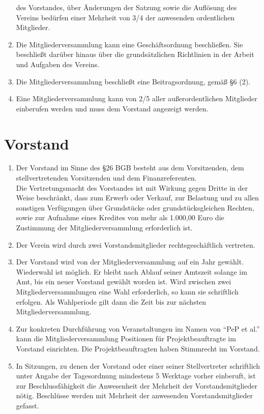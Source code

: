 \documentclass[
  fontsize=12pt,
  paper=a4,
  DIV14,
  parskip,
]{scrartcl}
\begin{document}
\begin{enumerate}
		des Vorstandes, über Änderungen der Satzung sowie die Auflösung des Vereins
		bedürfen einer Mehrheit von 3/4 der anwesenden ordentlichen Mitglieder.
	\item Die Mitgliederversammlung kann eine Geschäftsordnung beschließen. Sie
		beschließt darüber hinaus über die grundsätzlichen Richtlinien in der
		Arbeit und Aufgaben des Vereins.
	\item Die Mitgliederversammlung beschließt eine Beitragsordnung, gemäß §6 (2).
	\item Eine Mitgliederversammlung kann von 2/5 aller außerordentlichen
		Mitglieder einberufen werden und muss dem Vorstand angezeigt werden.
\end{enumerate}

\section{Vorstand}

\begin{enumerate}
	\item Der Vorstand im Sinne des §26 BGB besteht aus dem Vorsitzenden, dem
		stellvertretenden Vorsitzenden und dem Finanzreferenten.\\
		Die Vertretungsmacht des Vorstandes ist mit Wirkung gegen Dritte in der
		Weise beschränkt, dass zum Erwerb oder Verkauf, zur Belastung und zu allen
		sonstigen Verfügungen über Grundstücke oder grundstücksgleichen Rechten,
		sowie zur Aufnahme eines Kredites von mehr als 1.000,00 Euro die Zustimmung
		der Mitgliederversammlung erforderlich ist.
	\item Der Verein wird durch zwei Vorstandsmitglieder rechtsgeschäftlich
		vertreten.
	\item Der Vorstand wird von der Mitgliederversammlung auf ein Jahr gewählt.
		Wiederwahl ist möglich. Er bleibt nach Ablauf seiner Amtszeit solange im
		Amt, bis ein neuer Vorstand gewählt worden ist. Wird zwischen zwei
		Mitgliederversammlungen eine Wahl erforderlich, so kann sie schriftlich
		erfolgen. Als Wahlperiode gilt dann die Zeit bis zur nächsten
		Mitgliederversammlung.
	\item Zur konkreten Durchführung von Veranstaltungen im Namen von \enquote{PeP
		et al.} kann die Mitgliederversammlung Positionen für
		Projektbeauftragte im Vorstand einrichten. Die Projektbeauftragten haben
		Stimmrecht im Vorstand.
	\item In Sitzungen, zu denen der Vorstand oder einer seiner Stellvertreter
		schriftlich unter Angabe der Tagesordnung mindestens 5 Werktage vorher
		einberuft, ist zur Beschlussfähigkeit die Anwesenheit der Mehrheit der
		Vorstandsmitglieder nötig. Beschlüsse werden mit Mehrheit der anwesenden
		Vorstandsmitglieder gefasst.
\end{enumerate}
\end{document}
